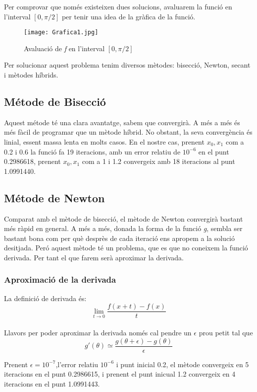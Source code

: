 \documentclass{article}
\begin{document}
Per comprovar que nom\'es existeixen dues solucions, avaluarem la funció en l'interval $[0,\pi/2]$ per tenir una idea de la gr\`afica de la funci\'o. \\

\begin{figure}[h!]
  \texttt{[image: Grafica1.jpg]}
  \caption{Avaluaci\'o de \emph{f} en l'interval $[0,\pi/2]$}
  \label{fig:grafica1}
\end{figure}

Per solucionar aquest problema tenim diversos m\`etodes: bisecci\'o, Newton, secant i m\`etodes h\'ibrids.

\subsection*{M\'etode de Bisecci\'o}
\quad Aquest m\'etode t\'e una clara avantatge, sabem que convergir\`a. A més a m\'es és més f\`acil de programar que un m\`etode h\'ibrid. No obstant, la seva convergència és linial, essent massa lenta en molts casos. En el nostre cas, prenent $x_{0},x_{1}$ com a 0.2 i 0.6 la funci\'o fa 19 iteracions, amb un error relatiu de $10^{-6}$ en el punt 0.2986618, prenent  $x_{0},x_{1}$ com a 1 i 1.2 convergeix amb 18 iteracions al punt 1.0991440.  


\subsection*{M\'etode de Newton}
\quad Comparat amb el m\`etode de bisecci\'o, el mètode de Newton convergir\`a bastant m\'es r\`apid en general. A més a més, donada la forma de la funci\'o \emph{g}, sembla ser bastant bona com per qu\`e despr\`es de cada iteraci\'o ens apropem a la soluci\'o desitjada. Per\'o aquest m\`etode t\'e un problema, que es que no coneixem la funci\'o derivada. Per tant el que farem ser\`a aproximar la derivada.

\subsubsection*{Aproximaci\'o de la derivada}
\quad La definici\'o de derivada \'es:
	 $$\lim_{t\to0} \frac{f(x+t) - f(x)}{t}$$ \\
Llavors per poder aproximar la derivada nom\'es cal pendre un $\epsilon$ prou petit tal que $$g'(\theta) \simeq \frac{g(\theta+\epsilon) - g(\theta)}{\epsilon}$$

Prenent $\epsilon = 10^{-7}$,l'error relatiu $10^{-6}$ i punt inicial 0.2, el m\`etode convergeix en 5 iteracions en el punt 0.2986615, i prenent el punt inicual 1.2 convergeix en 4 iteracions en el punt 1.0991443.
\end{document}
